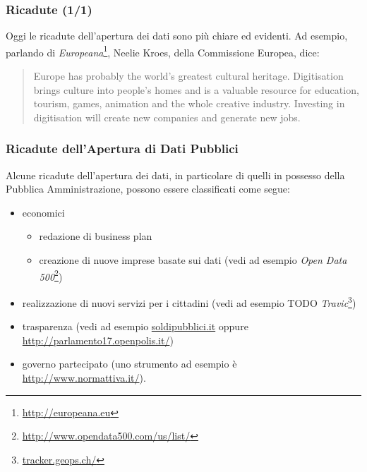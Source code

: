 \documentclass[8pt]{beamer}
\begin{document}
\begin{frame}
\frametitle{Ricadute (1/1)}

Oggi le ricadute dell'apertura dei dati sono pi\`u chiare ed evidenti.
Ad esempio, parlando di \emph{Europeana}\footnote{\url{http://europeana.eu}},
Neelie Kroes, della Commissione Europea, dice:
\vspace{\baselineskip}

\begin{quote}
Europe has probably the world’s greatest cultural heritage. Digitisation brings
culture into people’s homes and is a valuable resource for education, tourism,
games, animation and the whole creative industry. Investing in digitisation will
create new companies and generate new jobs.
\end{quote}
\end{frame}

\begin{frame}
\frametitle{Ricadute dell'Apertura di Dati Pubblici}
Alcune ricadute dell'apertura dei dati, in particolare di quelli in possesso 
della Pubblica Amministrazione, possono essere classificati come segue:
\vspace{\baselineskip}

\begin{itemize} [<+->]
 \item economici
 \begin{itemize}
  \item redazione di business plan
  \item creazione di nuove imprese basate sui dati (vedi ad esempio \emph{Open Data 500}\footnote{\url{http://www.opendata500.com/us/list/}})
 \end{itemize}
 \item realizzazione di nuovi servizi per i cittadini (vedi ad esempio TODO \emph{Travic}\footnote{\url{tracker.geops.ch/}})
 \item trasparenza (vedi ad esempio \url{soldipubblici.it} oppure \url{http://parlamento17.openpolis.it/})
 \item governo partecipato (uno strumento ad esempio è \url{http://www.normattiva.it/}).
\end{itemize}
\end{frame}
\end{document}
